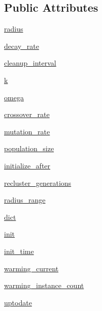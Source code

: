 \subsection*{Public Attributes}
\begin{DoxyCompactItemize}
\item 
\hyperlink{classEvoStreamV2_1_1EvoStreamV2_a75ef94c8934d36dd0ff1b2be79f89119}{radius}
\item 
\hyperlink{classEvoStreamV2_1_1EvoStreamV2_a5a56d86b5a816516ebe4bc063e4a6d36}{decay\+\_\+rate}
\item 
\hyperlink{classEvoStreamV2_1_1EvoStreamV2_a8a5bb2fe93ea6fd5d074f16ab41da87b}{cleanup\+\_\+interval}
\item 
\hyperlink{classEvoStreamV2_1_1EvoStreamV2_ad8d6aa02c00965d6661dc2aa0246e04d}{k}
\item 
\hyperlink{classEvoStreamV2_1_1EvoStreamV2_a90688a5e06335198cfe214fad0553dec}{omega}
\item 
\hyperlink{classEvoStreamV2_1_1EvoStreamV2_abc20e76d1d04f14ffb90c6df2535b117}{crossover\+\_\+rate}
\item 
\hyperlink{classEvoStreamV2_1_1EvoStreamV2_a65222a3db362edea70e22461df9f359e}{mutation\+\_\+rate}
\item 
\hyperlink{classEvoStreamV2_1_1EvoStreamV2_a5d970a6ae637621aad571aff51b09474}{population\+\_\+size}
\item 
\hyperlink{classEvoStreamV2_1_1EvoStreamV2_a31440e7607136a0d07a9cdbd3f4fe455}{initialize\+\_\+after}
\item 
\hyperlink{classEvoStreamV2_1_1EvoStreamV2_a3e97b9f501eb0b96cc2d1cfb6ce56cfd}{recluster\+\_\+generations}
\item 
\hyperlink{classEvoStreamV2_1_1EvoStreamV2_a3009f001789c590a2938f426c45426cf}{radius\+\_\+range}
\item 
\hyperlink{classEvoStreamV2_1_1EvoStreamV2_a3df129ad99196ac838aebf4219853304}{dict}
\item 
\hyperlink{classEvoStreamV2_1_1EvoStreamV2_afcace4b3fa614c76290433b71c59a1b8}{init}
\item 
\hyperlink{classEvoStreamV2_1_1EvoStreamV2_ac65bfef403e18c2bf3bd16fab2b336a1}{init\+\_\+time}
\item 
\hyperlink{classEvoStreamV2_1_1EvoStreamV2_ac76e5946bf3a9d81315e649455668195}{warming\+\_\+current}
\item 
\hyperlink{classEvoStreamV2_1_1EvoStreamV2_a3db3557961ca242970889b64d67d78be}{warming\+\_\+instance\+\_\+count}
\item 
\hyperlink{classEvoStreamV2_1_1EvoStreamV2_ac84c6906542ba283936a530209a1fe01}{uptodate}

\end{DoxyCompactItemize}
